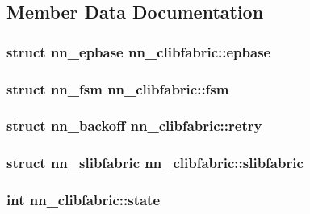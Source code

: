 \subsection{Member Data Documentation}
\subsubsection[{epbase}]{\setlength{\rightskip}{0pt plus 5cm}struct {\bf nn\+\_\+epbase} nn\+\_\+clibfabric\+::epbase}\hypertarget{structnn__clibfabric_acdc1beac545401968ce1735fc153676f}{}\label{structnn__clibfabric_acdc1beac545401968ce1735fc153676f}
\subsubsection[{fsm}]{\setlength{\rightskip}{0pt plus 5cm}struct {\bf nn\+\_\+fsm} nn\+\_\+clibfabric\+::fsm}\hypertarget{structnn__clibfabric_a79bf5d5042cc883c3492a3f9221b8074}{}\label{structnn__clibfabric_a79bf5d5042cc883c3492a3f9221b8074}
\subsubsection[{retry}]{\setlength{\rightskip}{0pt plus 5cm}struct {\bf nn\+\_\+backoff} nn\+\_\+clibfabric\+::retry}\hypertarget{structnn__clibfabric_af75d0e9ca24bce5dba607471dd930976}{}\label{structnn__clibfabric_af75d0e9ca24bce5dba607471dd930976}
\subsubsection[{slibfabric}]{\setlength{\rightskip}{0pt plus 5cm}struct {\bf nn\+\_\+slibfabric} nn\+\_\+clibfabric\+::slibfabric}\hypertarget{structnn__clibfabric_ac0a7255ca2f0d8a7af3a62723d415297}{}\label{structnn__clibfabric_ac0a7255ca2f0d8a7af3a62723d415297}
\subsubsection[{state}]{\setlength{\rightskip}{0pt plus 5cm}int nn\+\_\+clibfabric\+::state}\hypertarget{structnn__clibfabric_add852039e47247c9eac1575f90844988}{}\label{structnn__clibfabric_add852039e47247c9eac1575f90844988}
